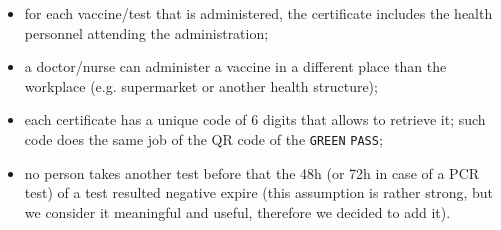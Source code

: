 \documentclass{article}
\begin{document}
\begin{itemize}
\item for each vaccine/test that is administered, the certificate includes the health personnel attending the administration;
\item a doctor/nurse can administer a vaccine in a different place than the workplace (e.g. supermarket or another health structure);
\item each certificate has a unique code of 6 digits that allows to retrieve it; such code does the same job of the QR code of the \verb|GREEN| \verb|PASS|;
\item no person takes another test before that the 48h (or 72h in case of a PCR test) of a test resulted negative expire (this assumption is rather strong, but we consider it meaningful and useful, therefore we decided to add it).
\end{itemize}
\newpage
\end{document}
